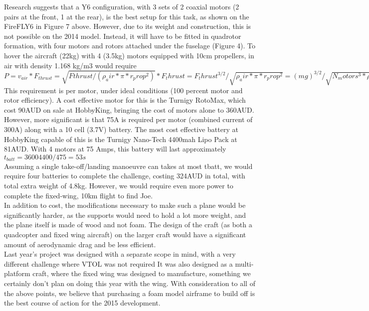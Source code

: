 \color{black}

Research suggests that a Y6 configuration, with 3 sets of 2 coaxial motors (2 pairs at the front, 1 at the rear), is the best setup for this task, as shown on the FireFLY6 in Figure 7 above. However, due to its weight and construction, this is not possible on the 2014 model. Instead, it will have to be fitted in quadrotor formation, with four motors and rotors attached under the fuselage (Figure 4). To hover the aircraft (22kg) with 4 (3.5kg) motors equipped with 10cm propellers, in air with density 1.168 kg/m3 would require\\

$P=v_{air}*F_{thrust}=\sqrt{F{thrust}/(\rho_air*\pi*r_prop^2)}*F_thrust=F_thrust^{3/2}/\sqrt{\rho_air*\pi*r_prop^2}=(mg)^{3/2}/\sqrt{N_motors^3*\rho_air*\pi*r_prop^2=2500W}$\\

This requirement is per motor, under ideal conditions (100 percent motor and rotor efficiency). A cost effective motor for this is the Turnigy RotoMax, which cost 90AUD on sale at HobbyKing, bringing the cost of motors alone to 360AUD. However, more significant is that 75A is required per motor (combined current of 300A) along with a 10 cell (3.7V) battery.  The most cost effective battery at HobbyKing capable of this is the Turnigy Nano-Tech 4400mah Lipo Pack at 81AUD. With 4 motors at 75 Amps, this battery will last approximately
$t_{batt}=36004400/475=53s$\\

Assuming a single take-off/landing manoeuvre can takes at most tbatt, we would require four batteries to complete the challenge, costing 324AUD in total, with total extra weight of 4.8kg. However, we would require even more power to complete the fixed-wing, 10km flight to find Joe.\\

In addition to cost, the modifications necessary to make such a plane would be significantly harder, as the supports would need to hold a lot more weight, and the plane itself is made of wood and not foam. The design of the craft (as both a quadcopter and fixed wing aircraft) on the larger craft would have a significant amount of aerodynamic drag and be less efficient.\\

Last year’s project was designed with a separate scope in mind, with a very different challenge where VTOL was not required It was also designed as a multi-platform craft, where the fixed wing was designed to manufacture, something we certainly don’t plan on doing this year with the wing. With consideration to all of the above points, we believe that purchasing a foam model airframe to build off is the best course of action for the 2015 development.